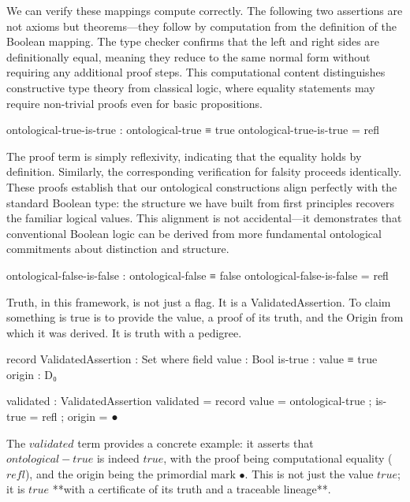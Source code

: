 \documentclass[11pt,a4paper]{book}
\def\texttt#1{#1}%
\def\text#1{#1}%
\begin{document}
We can verify these mappings compute correctly. The following two assertions are not axioms but theorems—they follow by computation from the definition of the Boolean mapping. The type checker confirms that the left and right sides are definitionally equal, meaning they reduce to the same normal form without requiring any additional proof steps. This computational content distinguishes constructive type theory from classical logic, where equality statements may require non-trivial proofs even for basic propositions.

\begin{code}
ontological-true-is-true : ontological-true ≡ true
ontological-true-is-true = refl
\end{code}

The proof term is simply reflexivity, indicating that the equality holds by definition. Similarly, the corresponding verification for falsity proceeds identically. These proofs establish that our ontological constructions align perfectly with the standard Boolean type: the structure we have built from first principles recovers the familiar logical values. This alignment is not accidental—it demonstrates that conventional Boolean logic can be derived from more fundamental ontological commitments about distinction and structure.

\begin{code}
ontological-false-is-false : ontological-false ≡ false
ontological-false-is-false = refl
\end{code}

Truth, in this framework, is not just a flag. It is a \texttt{ValidatedAssertion}. To claim something is true is to provide the value, a proof of its truth, and the Origin from which it was derived. It is truth with a pedigree.

\begin{code}
record ValidatedAssertion : Set where
  field
    value : Bool
    is-true : value ≡ true
    origin : D₀
\end{code}

\begin{code}
validated : ValidatedAssertion
validated = record
  { value = ontological-true
  ; is-true = refl
  ; origin = ●
  }
\end{code}

The $\texttt{validated}$ term provides a concrete example: it asserts that 
$\text{ontological-true}$ is indeed $\texttt{true}$, with the proof being 
computational equality ($\texttt{refl}$), and the origin being the primordial 
mark $\bullet$. This is not just the value $\texttt{true}$; it is $\texttt{true}$ 
**with a certificate of its truth and a traceable lineage**.
\end{document}
